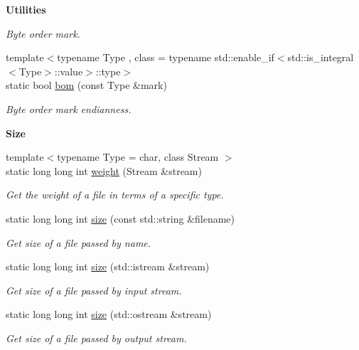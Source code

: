 \begin{Indent}{\bf Utilities}
\begin{DoxyCompactItemize}
\begin{DoxyCompactList}\small\item\em Byte order mark. \end{DoxyCompactList}\item 
{\footnotesize template$<$typename Type , class  = typename std\-::enable\-\_\-if$<$std\-::is\-\_\-integral$<$\-Type$>$\-::value$>$\-::type$>$ }\\static bool \hyperlink{exceptionmagrathea_1_1FileSystem_a8bc7bab8ef392d0e64176fa9249f1f34}{bom} (const Type \&mark)
\begin{DoxyCompactList}\small\item\em Byte order mark endianness. \end{DoxyCompactList}\end{DoxyCompactItemize}
\end{Indent}
\begin{Indent}{\bf Size}\par
\begin{DoxyCompactItemize}
\item 
{\footnotesize template$<$typename Type  = char, class Stream $>$ }\\static long long int \hyperlink{exceptionmagrathea_1_1FileSystem_ae163e0811a033225b60eac354e4e4b79}{weight} (Stream \&stream)
\begin{DoxyCompactList}\small\item\em Get the weight of a file in terms of a specific type. \end{DoxyCompactList}\item 
static long long int \hyperlink{exceptionmagrathea_1_1FileSystem_a221bf898f3123b019033a104b54c545c}{size} (const std\-::string \&filename)
\begin{DoxyCompactList}\small\item\em Get size of a file passed by name. \end{DoxyCompactList}\item 
static long long int \hyperlink{exceptionmagrathea_1_1FileSystem_a2dda7047196f0a54857709a39e0f0159}{size} (std\-::istream \&stream)
\begin{DoxyCompactList}\small\item\em Get size of a file passed by input stream. \end{DoxyCompactList}\item 
static long long int \hyperlink{exceptionmagrathea_1_1FileSystem_a2ff3132806866f74d193f60bff56d6a9}{size} (std\-::ostream \&stream)
\begin{DoxyCompactList}\small\item\em Get size of a file passed by output stream. \end{DoxyCompactList}\end{DoxyCompactItemize}
\end{Indent}
